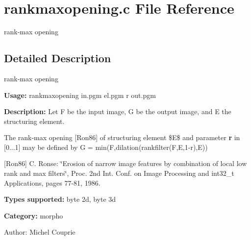 \section{rankmaxopening.c File Reference}
\label{rankmaxopening_8c}
rank-max opening 



\subsection{Detailed Description}
rank-max opening 

{\bf Usage:} rankmaxopening in.pgm el.pgm r out.pgm

{\bf Description:} Let F be the input image, G be the output image, and E the structuring element.

The rank-max opening [Ron86] of structuring element \$E\$ and parameter {\bf r} in [0...1] may be defined by G = min(F,dilation(rankfilter(F,E,1-r),E))

[Ron86] C. Ronse: \char`\"{}Erosion of narrow image features by combination of local low rank and max filters\char`\"{}, Proc. 2nd Int. Conf. on Image Processing and int32\_\-t Applications, pages 77-81, 1986.

{\bf Types supported:} byte 2d, byte 3d

{\bf Category:} morpho

\begin{Desc}
\item[Author:]Michel Couprie \end{Desc}
